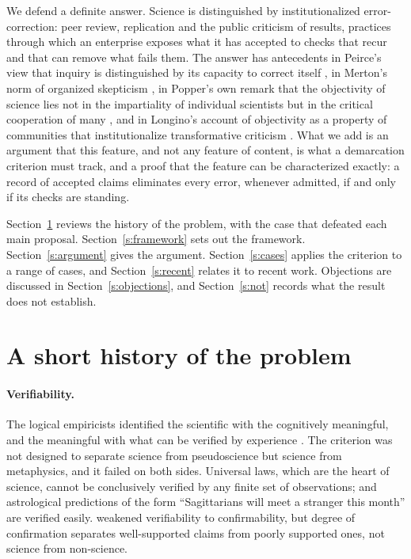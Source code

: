 \documentclass{situationist-preprint}
\begin{document}
We defend a definite answer. Science is distinguished by institutionalized error-correction: peer review, replication and the public criticism of results, practices through which an enterprise exposes what it has accepted to checks that recur and that can remove what fails them. The answer has antecedents in Peirce's view that inquiry is distinguished by its capacity to correct itself \citep{Peirce1877}, in Merton's norm of organized skepticism \citep{Merton1973}, in Popper's own remark that the objectivity of science lies not in the impartiality of individual scientists but in the critical cooperation of many \citep[ch.~23]{Popper1945}, and in Longino's account of objectivity as a property of communities that institutionalize transformative criticism \citep{Longino1990,Longino2002}. What we add is an argument that this feature, and not any feature of content, is what a demarcation criterion must track, and a proof that the feature can be characterized exactly: a record of accepted claims eliminates every error, whenever admitted, if and only if its checks are standing.

Section~\ref{s:history} reviews the history of the problem, with the case that defeated each main proposal. Section~\ref{s:framework} sets out the framework. Section~\ref{s:argument} gives the argument. Section~\ref{s:cases} applies the criterion to a range of cases, and Section~\ref{s:recent} relates it to recent work. Objections are discussed in Section~\ref{s:objections}, and Section~\ref{s:not} records what the result does not establish.

\section{A short history of the problem}\label{s:history}

\paragraph{Verifiability.} The logical empiricists identified the scientific with the cognitively meaningful, and the meaningful with what can be verified by experience \citep{Ayer1936}. The criterion was not designed to separate science from pseudoscience but science from metaphysics, and it failed on both sides. Universal laws, which are the heart of science, cannot be conclusively verified by any finite set of observations; and astrological predictions of the form \enquote{Sagittarians will meet a stranger this month} are verified easily. \citet{Carnap1936} weakened verifiability to confirmability, but degree of confirmation separates well-supported claims from poorly supported ones, not science from non-science.
\end{document}
